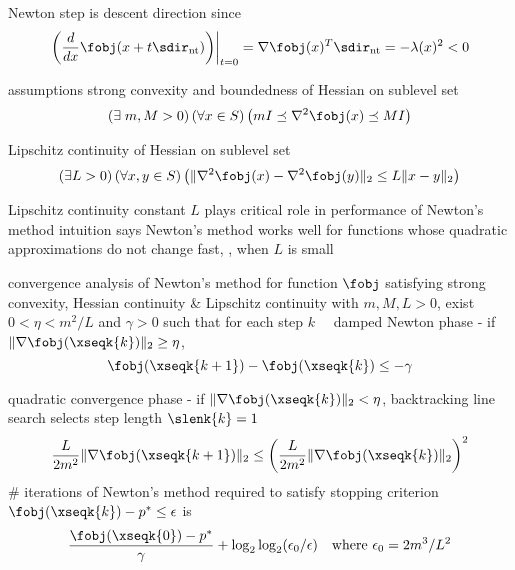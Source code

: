 \documentclass[17pt,landscape]{foils}
\begin{document}
{\bit
\item
	Newton step is descent direction since
	$$
		\left.
		\left(
		\frac{d}{dx}\fobj(x+t\sdir_\mathrm{nt})
		\right)
		\right|_{t=0}
		=
		\nabla \fobj(x) ^T \sdir_\mathrm{nt}
		=
		- \lambda(x)^2
		<0
	$$
\eit
\vfill



\bit
\item
	assumptions
	\bit
	\vitem
		strong convexity and boundedness of Hessian on sublevel set\
		$$
			\left(
				\exists\; m, M > 0
			\right)
			\left(
				\forall x \in S
			\right)
			\left(
				mI \preceq \nabla^2 \fobj(x) \preceq MI
			\right)
		$$

	\vitem
		Lipschitz continuity of Hessian on sublevel set\
		$$
			\left(
				\exists L > 0
			\right)
			\left(
				\forall x,y\in S
			\right)
			\left(
				\|\nabla^2 \fobj(x)- \nabla^2\fobj(y)\|_2 \leq L \|x-y\|_2
			\right)
		$$
	\eit

\vvitem
	Lipschitz continuity constant $L$ plays critical role
	in performance of Newton's method
	\bit
	\vitem
		intuition says
		Newton's method
		works well for functions
		whose quadratic approximations
		do not change fast,
		\ie,
		when $L$ is small
	\eit
\eit
\vfill



\begin{mytheorem}{convergence analysis of Newton's method}
	for function $\fobj$ satisfying strong convexity, Hessian continuity \& Lipschitz continuity
	with $m, M, L>0$,
	exist $0<\eta<m^2/L$ and $\gamma > 0$
	such that
	for each step $k$\
	\shrinkspacewithintheoremslike\
	\ibit
	\iitem
		damped Newton phase
		-
		if $\|\nabla \fobj(\xseqk{k})\|_2 \geq \eta$,
		$$
			\fobj(\xseqk{k+1}) - \fobj(\xseqk{k}) \leq - \gamma
		$$

	\iitem
		quadratic convergence phase
		-
		if $\|\nabla \fobj(\xseqk{k})\|_2 < \eta$,
		backtracking line search selects step length $\slenk{k}=1$
		$$
			\frac{L}{2m^2} \|\nabla \fobj(\xseqk{k+1})\|_2
				\leq
			\left(
				\frac{L}{2m^2} \|\nabla \fobj(\xseqk{k})\|_2
			\right)^2
		$$
	\eit
	\# iterations of Newton's method required to satisfy stopping criterion
	$\fobj(\xseqk{k})-p^\ast\leq\epsilon$ is
	$$
		\frac{\fobj(\xseqk{0}) - p^\ast}{\gamma}
		+ \log_2 \log_2 (\epsilon_0 / \epsilon)
		\quad
		\mbox{where }
		\epsilon_0 = 2 m^3/L^2
	$$
\end{mytheorem}


}
\end{document}
